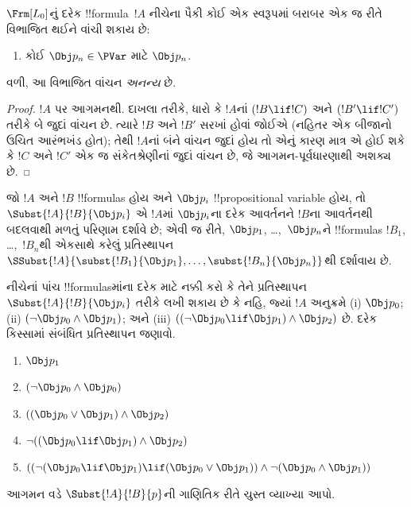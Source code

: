 \documentclass[../../../include/open-logic-section]{subfiles}
\begin{document}
\begin{prop}[અનન્ય વાચનીયતા]
$\Frm[L_0]$નું દરેક !!{formula}~$!A$ નીચેના પૈકી કોઈ એક સ્વરૂપમાં
બરાબર એક જ રીતે વિભાજિત થઈને વાંચી શકાય છે:
\begin{enumerate}


\item કોઈ $\Obj p_n \in \PVar$ માટે $\Obj p_n$.





\end{enumerate}
વળી, આ વિભાજિત વાંચન \emph{અનન્ય} છે.
\end{prop}

\begin{proof}
$!A$ પર આગમનથી. દાખલા તરીકે, ધારો કે $!A$નાં $(!B \lif !C)$ અને
$(!B' \lif !C')$ તરીકે બે જુદાં વાંચન છે. ત્યારે $!B$ અને $!B'$ સરખાં
હોવાં જોઈએ (નહિતર એક બીજાનો ઉચિત આરંભખંડ હોત); તેથી $!A$નાં બંને
વાંચન જુદાં હોય તો એનું કારણ માત્ર એ હોઈ શકે કે $!C$ અને $!C'$ એક જ
સંકેતશ્રેણીનાં જુદાં વાંચન છે, જે આગમન-પૂર્વધારણાથી અશક્ય છે.
\end{proof}


\begin{defn}[એકરૂપ પ્રતિસ્થાપન]
જો $!A$ અને $!B$ !!{formula}s હોય અને $\Obj p_i$ !!{propositional
variable} હોય, તો $\Subst{!A}{!B}{\Obj p_i}$ એ $!A$માં $\Obj p_i$ના
દરેક આવર્તનને $!B$ના આવર્તનથી બદલવાથી મળતું પરિણામ દર્શાવે છે;
એવી જ રીતે, $\Obj p_1$, \dots,~$\Obj p_n$ને !!{formula}s $!B_1$,
\dots,~$!B_n$થી એકસાથે કરેલું પ્રતિસ્થાપન
$\SSubst{!A}{\subst{!B_1}{\Obj p_1},\dots,\subst{!B_n}{\Obj p_n}}$થી
દર્શાવાય છે.
\end{defn}

\begin{prob} નીચેનાં પાંચ !!{formula}sમાંના દરેક માટે નક્કી કરો કે
 તેને પ્રતિસ્થાપન \( \Subst{!A}{!B}{\Obj p_i} \) તરીકે લખી શકાય છે કે નહિ,
 જ્યાં \( !A \) અનુક્રમે (i) \( \Obj p_0 \); (ii) \( ( \lnot \Obj p_0 \land \Obj
 p_1) \); અને (iii) \( ( ( \lnot \Obj p_0 \lif \Obj p_1 ) \land \Obj
 p_2 ) \) છે. દરેક કિસ્સામાં સંબંધિત પ્રતિસ્થાપન જણાવો.
  \begin{enumerate}
    \item \( \Obj p_1 \)
    \item \( ( \lnot \Obj p_0 \land \Obj p_0 ) \)
    \item \( ( ( \Obj p_0 \lor \Obj p_1 ) \land \Obj p_2 )  \)
    \item \( \lnot ( ( \Obj p_0 \lif \Obj p_1 ) \land \Obj p_2 ) \)
    \item \( (( \lnot ( \Obj p_0 \lif \Obj p_1 ) \lif ( \Obj p_0 \lor \Obj p_1 )) \land \lnot ( \Obj p_0 \land \Obj p_1 )) \)
  \end{enumerate}
\end{prob}

\begin{prob}
આગમન વડે $\Subst{!A}{!B}{p}$ની ગાણિતિક રીતે ચુસ્ત વ્યાખ્યા આપો.
\end{prob}
\end{document}
